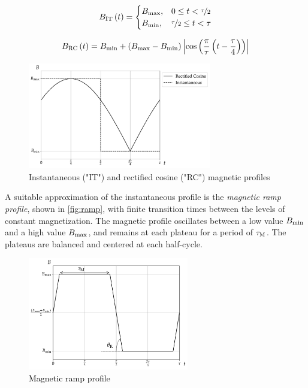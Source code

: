 \documentclass[referee]{svjour3}
\begin{document}
\begin{equation}
{B}_{\mathrm{IT}}\,(t)=
\begin{cases}
{B}_{\mathrm{max}}, & 0 \le t < \nicefrac{\tau}{2} \\
{B}_{\mathrm{min}}, & \nicefrac{\tau}{2} \le t < \tau\\
\end{cases}
\label{eq:199}
\end{equation}

\begin{equation}
{B}_{\mathrm{RC}}\,(t) = B_{\mathrm{min}} + \left(B_{\mathrm{max}} - B_{\mathrm{min}}\right)  \left\lvert \cos\left( \frac{\pi}{\tau} \left( t - \frac{\tau}{4}\right)\right) \right\rvert
\label{eq:200}
\end{equation}

\begin{figure}[!ht]
  \centering
  \includegraphics[width=8cm]{profiles_it_and_rc}
  \caption{Instantaneous ("IT") and rectified cosine ("RC") magnetic profiles}
  \label{fig:itrc}
\end{figure}

A suitable approximation of the instantaneous profile is the \emph{magnetic ramp profile}, shown in \autoref{fig:ramp}, with finite transition times between the levels of constant magnetization. The magnetic profile oscillates  between a low value \({B}_{\mathrm{min}}\) and a high value \({B}_{\mathrm{max}}\), and remains at each plateau for a period of \(\tau_{\mathrm{M}}\). The plateaus are balanced and centered at each half-cycle.

\begin{figure}[!ht]
  \centering
  \includegraphics[width=7cm]{profile_rm}
  \caption{\textcolor{black}{Magnetic ramp}  profile}
  \label{fig:ramp}
\end{figure}
\end{document}
